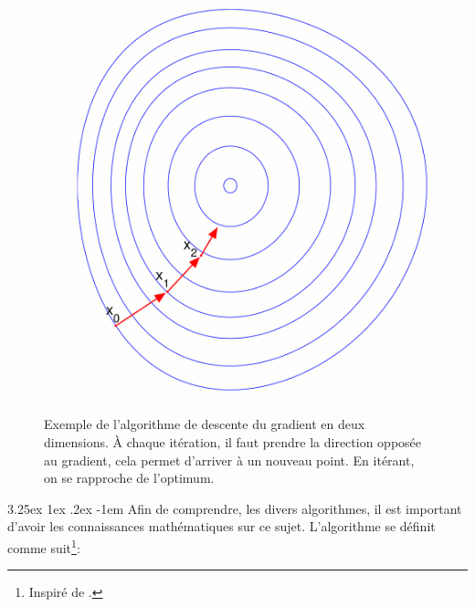 \documentclass[a4paper, 11pt]{article}
\makeatletter
\renewcommand\paragraph{\@startsection{paragraph}{5}{\z@}%
  {3.25ex \@plus1ex \@minus.2ex}%
  {-1em}%
  {\normalfont\normalsize\bfseries}}
\makeatother
\begin{document}
\begin{figure}[H]
\centering
\includegraphics[scale=0.40]{images/descente_gradient_exemple}
\caption[]{Exemple de l'algorithme de descente du gradient en deux dimensions. À chaque itération,
il faut prendre la direction opposée au gradient\footnotemark, cela permet d'arriver à un nouveau
point. En itérant, on se rapproche de l'optimum. }
\label{descente_gradient_exemple}
\end{figure}


\paragraph{}
Afin de comprendre, les divers algorithmes, il est important d'avoir les connaissances mathématiques
sur ce sujet. L'algorithme se définit comme suit\footnote{Inspiré de \cite{wikipedia_descente_du_gradient}.}:
\end{document}
